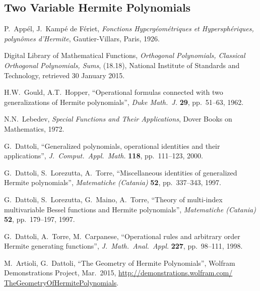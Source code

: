 \subsection*{Two Variable Hermite Polynomials}
\begin{enumerate}[label={[\arabic*]}]
\item P.~App\'el, J.~Kamp\'e de F\'eriet,
      \emph{Fonctions Hypcrg\'eom\'etriques et Hypersph\'eriques,
      polyn\^omes d'Hermite}, Gautier-Villars, Paris, 1926.
\item Digital Library of Mathematical Functions,
      \emph{Orthogonal Polynomials, Classical Orthogonal
      Polynomials, Sums}, (18.18), National Institute of
      Standards and Technology, retrieved 30 January 2015.
\item H.W.~Gould, A.T.~Hopper,
      ``Operational formulas connected with two generalizations
      of Hermite polynomials'',
      \emph{Duke Math.\ J.} \textbf{29}, pp.~51--63, 1962.
\item N.N.~Lebedev, \emph{Special Functions and Their
      Applications}, Dover Books on Mathematics, 1972.
\item G.~Dattoli, ``Generalized polynomials, operational
      identities and their applications'',
      \emph{J.\ Comput.\ Appl.\ Math.} \textbf{118},
      pp.~111--123, 2000.
\item G.~Dattoli, S.~Lorezutta, A.~Torre,
      ``Miscellaneous identities of generalized Hermite
      polynomials'', \emph{Matematiche (Catania)} \textbf{52},
      pp.~337--343, 1997.
\item G.~Dattoli, S.~Lorezutta, G.~Maino, A.~Torre,
      ``Theory of multi-index multivariable Bessel functions
      and Hermite polynomials'',
      \emph{Matematiche (Catania)} \textbf{52},
      pp.~179--197, 1997.
\item G.~Dattoli, A.~Torre, M.~Carpanese,
      ``Operational rules and arbitrary order Hermite
      generating functions'',
      \emph{J.\ Math.\ Anal.\ Appl.} \textbf{227},
      pp.~98--111, 1998.
\item M.~Artioli, G.~Dattoli,
      ``The Geometry of Hermite Polynomials'',
      Wolfram Demonstrations Project, Mar.~2015,
      \url{http://demonstrations.wolfram.com/
      TheGeometryOfHermitePolynomials}.
\end{enumerate}

